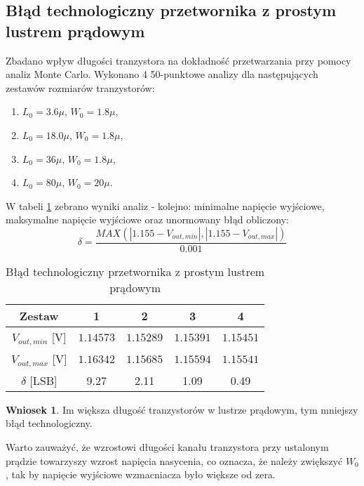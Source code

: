 \documentclass[10pt,a4paper,twoside]{report}
\theoremstyle{definition}
\theoremstyle{definition}
\theoremstyle{definition}
\theoremstyle{definition}
\theoremstyle{definition}
\newtheorem{wniosek}{Wniosek}[section]
\begin{document}
{{{	\subsection{Błąd technologiczny przetwornika z prostym lustrem prądowym}
	{	Zbadano wpływ długości tranzystora na dokładność przetwarzania przy pomocy analiz Monte Carlo. Wykonano 4 50-punktowe analizy dla następujących zestawów rozmiarów tranzystorów:
		\begin{enumerate}
			\item $L_0 = 3.6\mu$, $W_0 = 1.8\mu$,
			\item $L_0 = 18.0\mu$, $W_0 = 1.8\mu$,
			\item $L_0 = 36\mu$, $W_0 = 1.8\mu$,
			\item $L_0 = 80\mu$, $W_0 = 20\mu$.
		\end{enumerate}
	W tabeli \ref{tab:delta_simple} zebrano wyniki analiz - kolejno: minimalne napięcie wyjściowe, maksymalne napięcie wyjściowe oraz unormowany błąd obliczony:
	$$
	\delta = \frac{MAX(|1.155-V_{out,min}|,|1.155-V_{out,max}|)}{0.001}
	$$

	\begin{table}[!ht]
	\begin{center}				
		\begin{tabular}{|c|c|c|c|c|}
			\hline 
			Zestaw & 1 & 2 & 3  & 4\\ 
			\hline 
			$V_{out,min}$ [V] & $1.14573$ & $1.15289$ & $1.15391$ & $1.15451$ \\ 
			\hline
			$V_{out,max}$ [V] & $1.16342$ & $1.15685$ & $1.15594$ & $1.15541$\\ 
			\hline 
			$\delta$ [LSB]  & 9.27 & 2.11 & 1.09 & 0.49\\
			\hline
		\end{tabular} 
	\caption{Błąd technologiczny przetwornika z prostym lustrem prądowym}
	\label{tab:delta_simple}
	\end{center}
	\end{table}

	\begin{wniosek}{Im większa długość tranzystorów w lustrze prądowym, tym mniejszy błąd technologiczny.}
	\end{wniosek}

	Warto zauważyć, że wzrostowi długości kanału tranzystora przy ustalonym prądzie towarzyszy wzrost napięcia nasycenia, co oznacza, że należy zwiększyć $W_0$, tak by napięcie wyjściowe wzmacniacza było większe od zera.
	
}}}}
\end{document}
